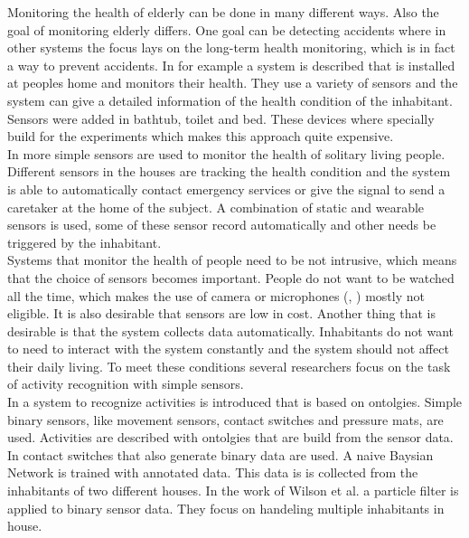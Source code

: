 Monitoring the health of elderly can be done in many different ways. Also the goal of monitoring elderly differs. One goal can be detecting accidents where in other systems the focus lays on the long-term health monitoring, which is in fact a way to prevent accidents. In \cite{Tamura1998573} for example a system is described that is installed at peoples home and monitors their health. They use a variety of sensors and the system can give a detailed information of the health condition of the inhabitant. Sensors were added in bathtub, toilet and bed. These devices where specially build for the experiments which makes this approach quite expensive.\\
In \cite{Kwon20125774} more simple sensors are used to monitor the health of solitary living people. Different sensors in the houses are tracking the health condition and the system is able to automatically contact emergency services or give the signal to send a caretaker at the home of the subject. A combination of static and wearable sensors is used, some of these sensor record automatically and other needs be triggered by the inhabitant.\\
Systems that monitor the health of people need to be not intrusive, which means that the choice of sensors becomes important. People do not want to be watched all the time, which makes the use of camera or microphones (\cite{Nagai2010204}, \cite{Wu_2003_4676}) mostly not eligible.
It is also desirable that sensors are low in cost. Another thing that is desirable is that the system collects data automatically. Inhabitants do not want to need to interact with the system constantly and the system should not affect their daily living. To meet these conditions several researchers focus on the task of activity recognition with simple sensors.\\

In \cite{Hong2009236} a system to recognize activities is introduced that is based on ontolgies. Simple binary sensors, like movement sensors, contact switches and pressure mats, are used. Activities are described with ontolgies that are build from the sensor data.
In \cite{Tapia04activityrecognition} contact switches that also generate binary data are used. A naive Baysian Network is trained with annotated data. This data is is collected from the inhabitants of two different houses.
In the work of Wilson et al. \cite{Wilson:2005:STA:2154273.2154280} a particle filter is applied to binary sensor data. They focus on handeling multiple inhabitants in house.\\

